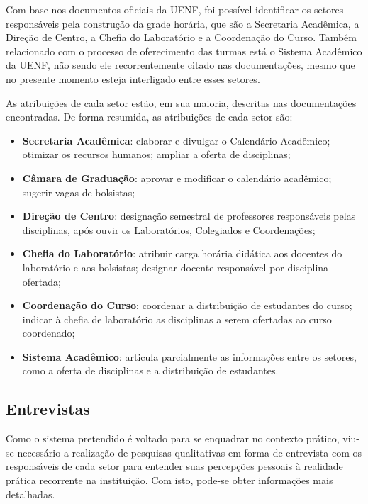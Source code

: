 
Com base nos documentos oficiais da UENF, foi possível identificar os setores responsáveis pela construção da grade horária, que são a Secretaria Acadêmica, a Direção de Centro, a Chefia do Laboratório e a Coordenação do Curso. Também relacionado com o processo de oferecimento das turmas está o Sistema Acadêmico da UENF, não sendo ele recorrentemente citado nas documentações, mesmo que no presente momento esteja interligado entre esses setores.

As atribuições de cada setor estão, em sua maioria, descritas nas documentações encontradas. De forma resumida, as atribuições de cada setor são:

\begin{itemize}
  \item \textbf{Secretaria Acadêmica}: elaborar e divulgar o Calendário Acadêmico; otimizar os recursos humanos; ampliar a oferta de disciplinas;
  \item \textbf{Câmara de Graduação}: aprovar e modificar o calendário acadêmico; sugerir vagas de bolsistas;
  \item \textbf{Direção de Centro}: designação semestral de professores responsáveis pelas disciplinas, após ouvir os Laboratórios, Colegiados e Coordenações;
  \item \textbf{Chefia do Laboratório}: atribuir carga horária didática aos docentes do laboratório e aos bolsistas; designar docente responsável por disciplina ofertada;
  \item \textbf{Coordenação do Curso}: coordenar a distribuição de estudantes do curso; indicar à chefia de laboratório as disciplinas a serem ofertadas ao curso coordenado;
  \item \textbf{Sistema Acadêmico}: articula parcialmente as informações entre os setores, como a oferta de disciplinas e a distribuição de estudantes.
\end{itemize}


\subsection{Entrevistas}

Como o sistema pretendido é voltado para se enquadrar no contexto prático, viu-se necessário a realização de pesquisas qualitativas em forma de entrevista com os responsáveis de cada setor para entender suas percepções pessoais à realidade prática recorrente na instituição. Com isto, pode-se obter informações mais detalhadas.

